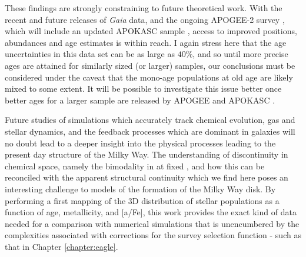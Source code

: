  These findings are strongly constraining to future theoretical work. With the recent \citep{2016arXiv160904303L} and future releases of \emph{Gaia} data, and the ongoing APOGEE-2 survey \citep{2014AAS...22344006S}, which will include an updated APOKASC sample \citep{2014ApJS..215...19P}, access to improved positions, abundances and age estimates is within reach. I again stress here that the age uncertainties in this data set can be as large as $40\%$, and so until more precise ages are attained for similarly sized (or larger) samples, our conclusions must be considered under the caveat that the mono-age populations at old age are likely mixed to some extent. It will be possible to investigate this issue better once better ages for a larger sample are released by APOGEE and APOKASC \citep{2014ApJS..215...19P}.

Future studies of simulations which accurately track chemical evolution, gas and stellar dynamics, and the feedback processes which are dominant in galaxies will no doubt lead to a deeper insight into the physical processes leading to the present day structure of the Milky Way. The understanding of discontinuity in chemical space, namely the bimodality in \afe{} at fixed \feh{}, and how this can be reconciled with the apparent structural continuity which we find here poses an interesting challenge to models of the formation of the Milky Way disk. By performing a first mapping of the 3D distribution of stellar populations as a function of age, metallicity, and [a/Fe], this work provides the exact kind of data needed for a comparison with numerical simulations that is unencumbered by the complexities associated with corrections for the survey selection function - such as that in Chapter \ref{chapter:eagle}.





